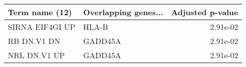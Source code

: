 \begin{tabular}{llr}
\toprule
 Term name (12) & Overlapping genes... &  Adjusted p-value \\
\midrule
SIRNA EIF4GI UP &                HLA-B &          2.91e-02 \\
    RB DN.V1 DN &              GADD45A &          2.91e-02 \\
   NRL DN.V1 UP &              GADD45A &          2.91e-02 \\
\bottomrule
\end{tabular}
